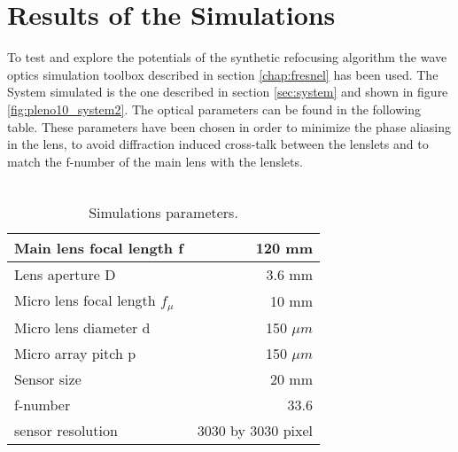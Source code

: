 \section{Results of the Simulations}
To test and explore the potentials of the synthetic refocusing algorithm the wave optics simulation toolbox described in section \ref{chap:fresnel} has been used. The System simulated is the one described in section \ref{sec:system} and shown in figure \ref{fig:pleno10_system2}. The optical parameters can be found in the following table. These parameters have been chosen in order to minimize the phase aliasing in the lens, to avoid diffraction induced cross-talk between the lenslets and to match the f-number of the main lens with the lenslets.
\\
\\
\begin{table}
	\centering
\begin{tabular}{l|r}

	Main lens focal length f & 120 mm\\ \hline
	Lens aperture D & 3.6 mm \\ \hline
	Micro lens focal length $f_{\mu}$ & 10 mm \\ \hline
	Micro lens diameter d & 150 $\mu m$ \\ \hline
	Micro array pitch p & 150 $\mu m$ \\ \hline
	Sensor size & 20 mm \\ \hline
	f-number & 33.6\\ \hline
	sensor resolution & 3030 by 3030 pixel \\ \hline	
%   
\end{tabular}
\caption{\label{tab:1} Simulations parameters. }
\end{table}

